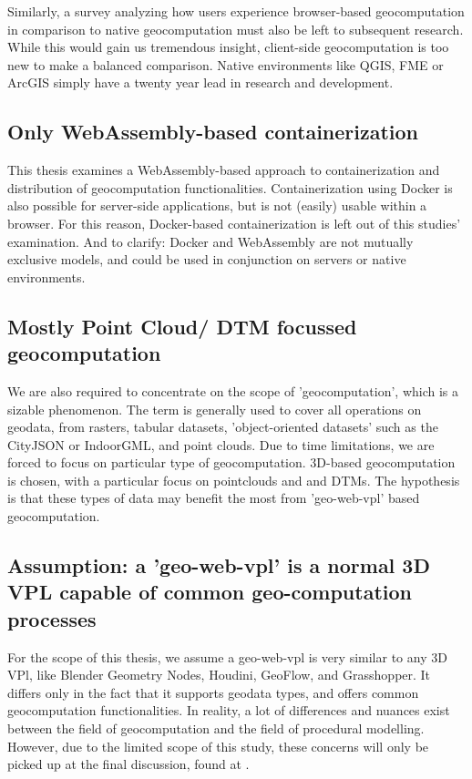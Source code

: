 Similarly, a survey analyzing how users experience browser-based geocomputation in comparison to native geocomputation must also be left to subsequent research. While this would gain us tremendous insight, client-side geocomputation is too new to make a balanced comparison. Native environments like QGIS, FME or ArcGIS simply have a twenty year lead in research and development. 


\subsection*{Only WebAssembly-based containerization}
This thesis examines a WebAssembly-based approach to containerization and distribution of geocomputation functionalities. 
Containerization using Docker is also possible for server-side applications, but is not (easily) usable within a browser. 
For this reason, Docker-based containerization is left out of this studies' examination. 
And to clarify: Docker and WebAssembly are not mutually exclusive models, and could be used in conjunction on servers or native environments. 

\subsection*{Mostly Point Cloud/ DTM focussed geocomputation}
We are also required to concentrate on the scope of 'geocomputation', which is a sizable phenomenon.
The term is generally used to cover all operations on geodata, from rasters, tabular datasets, 'object-oriented datasets' such as the CityJSON or IndoorGML, and point clouds. 
Due to time limitations, we are forced to focus on particular type of geocomputation.
3D-based geocomputation is chosen, with a particular focus on pointclouds and and DTMs. 
The hypothesis is that these types of data may benefit the most from 'geo-web-vpl' based geocomputation.

\subsection*{Assumption: a '\ac{geo-web-vpl}' is a normal 3D VPL capable of common geo-computation processes}
For the scope of this thesis, we assume a \ac{geo-web-vpl} is very similar to any 3D VPl, like Blender Geometry Nodes, Houdini, GeoFlow, and Grasshopper. 
It differs only in the fact that it supports geodata types, and offers common geocomputation functionalities. 
In reality, a lot of differences and nuances exist between the field of geocomputation and the field of procedural modelling. 
However, due to the limited scope of this study, these concerns will only be picked up at the final discussion, found at .
 
